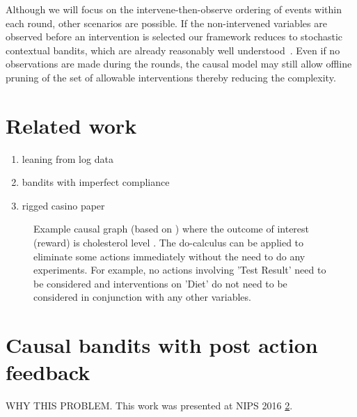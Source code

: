 \documentclass[11pt,a4paper,oneside]{book}
\theoremstyle{plain}
\theoremstyle{definition}
\begin{document}
Although we will focus on the intervene-then-observe ordering of events within each round, other scenarios are possible. If the non-intervened variables are observed before an intervention is selected our framework reduces to stochastic contextual bandits, which are already reasonably well understood~\citep{Agarwal2014}. Even if no observations are made during the rounds, the causal model may still allow offline pruning of the set of allowable interventions thereby reducing the complexity.


\section{Related work}
\begin{enumerate}
\item leaning from log data
\item bandits with imperfect compliance
\item rigged casino paper
\end{enumerate}

\begin{figure}[h]
\caption{Example causal graph (based on \cite{Koller2009}) where the outcome of interest (reward) is cholesterol level . The do-calculus can be applied to eliminate some actions immediately without the need to do any experiments. For example, no actions involving 'Test Result' need to be considered and interventions on 'Diet' do not need to be considered in conjunction with any other variables.}
\label{fig:cholesterol_graph}
\centering
{}
\end{figure}


\section{Causal bandits with post action feedback}
WHY THIS PROBLEM. This work was presented at NIPS 2016 \ref{}.
\end{document}

